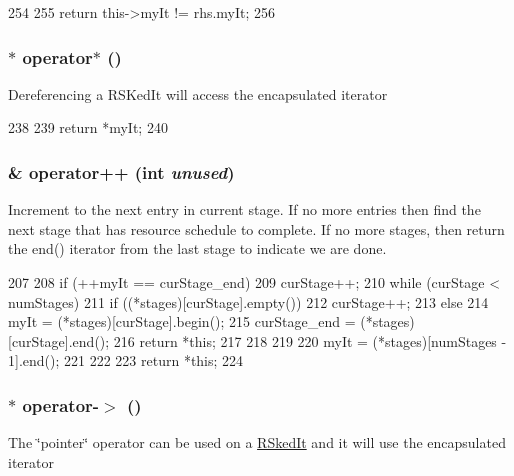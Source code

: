 \begin{DoxyCode}
254     {
255         return this->myIt != rhs.myIt;
256     }
\end{DoxyCode}
\hypertarget{classRSkedIt_af56c8e60fe7ffa5747cbcbfcc21bbef5}{
\subsubsection[{operator$\ast$}]{$\ast$ operator$\ast$ ()}}
\label{classRSkedIt_af56c8e60fe7ffa5747cbcbfcc21bbef5}
Dereferencing a RSKedIt will access the encapsulated iterator 


\begin{DoxyCode}
238     {
239         return *myIt;
240     }
\end{DoxyCode}
\hypertarget{classRSkedIt_a0d42c19d83a71f46da297ca5adac3843}{
\subsubsection[{operator++}]{\& operator++ (int {\em unused})}}
\label{classRSkedIt_a0d42c19d83a71f46da297ca5adac3843}
Increment to the next entry in current stage. If no more entries then find the next stage that has resource schedule to complete. If no more stages, then return the end() iterator from the last stage to indicate we are done. 


\begin{DoxyCode}
207     {
208         if (++myIt == curStage_end) {
209             curStage++;
210             while (curStage < numStages) {
211                 if ((*stages)[curStage].empty()) {
212                     curStage++;
213                 } else {
214                     myIt = (*stages)[curStage].begin();
215                     curStage_end = (*stages)[curStage].end();
216                     return *this;
217                 }
218             }
219 
220             myIt = (*stages)[numStages - 1].end();
221         }
222 
223         return *this;
224     }
\end{DoxyCode}
\hypertarget{classRSkedIt_a5733575f5f726d6b9be5964d6c68bae8}{
\subsubsection[{operator-\/$>$}]{$\ast$ operator-\/$>$ ()}}
\label{classRSkedIt_a5733575f5f726d6b9be5964d6c68bae8}
The \char`\"{}pointer\char`\"{} operator can be used on a \hyperlink{classRSkedIt}{RSkedIt} and it will use the encapsulated iterator 


